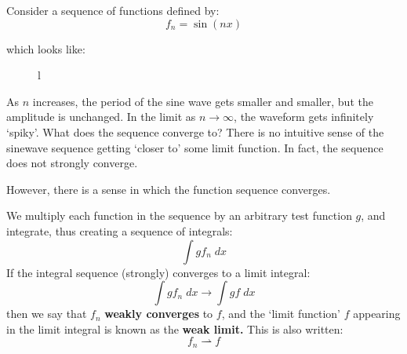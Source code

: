 \documentclass[12pt, a4paper, twoside, openright]{book}
\begin{document}
Consider a sequence of functions defined by:
\begin{equation}
f_n = \sin(n x)
\end{equation}

which looks like:
\begin{figure}[ht]
\centering
{}
\caption{l}\label{l}
\end{figure}

As $n$ increases, the period of the sine wave gets smaller and smaller, but the amplitude is unchanged.  In the limit as $n \to \infty$, the waveform gets infinitely `spiky'.  What does the sequence converge to?  There is no intuitive sense of the sinewave sequence getting `closer to' some limit function.  In fact, the sequence does not strongly converge.

However, there is a sense in which the function sequence converges. 

We multiply each function in the sequence by an arbitrary test function $g$, and integrate, thus creating a sequence of integrals:
\begin{equation}
\int g f_n \;dx
\end{equation}
If the integral sequence (strongly) converges to a limit integral:
\begin{equation}
\int g f_n \;dx \to \int g f \;dx
\end{equation}
then we say that $f_n$ \textbf{weakly converges} to $f$, and the `limit function' $f$ appearing in the limit integral is known as the \textbf{weak limit.}  This is also written:
\begin{equation}
f_n \rightharpoonup f
\end{equation}
\end{document}
